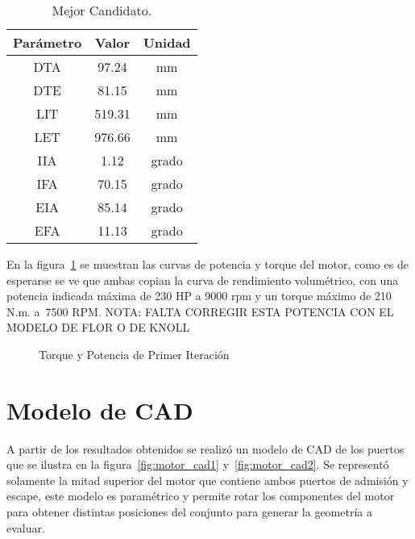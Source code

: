 \begin{table}
  \centering
  \begin{tabular}{ccc} \toprule
    Parámetro & Valor & Unidad \\ \midrule
    DTA & 97.24 & mm\\
    DTE & 81.15 & mm\\
    LIT & 519.31 & mm\\
    LET & 976.66 & mm\\
    IIA & 1.12 & grado\\
    IFA & 70.15 & grado\\
    EIA & 85.14 & grado\\
    EFA & 11.13 & grado\\ \bottomrule
  \end{tabular}
  \caption{Mejor Candidato.}\label{tab:resultado_primer_it}
\end{table}

En la figura~\ref{fig:PoTi_primer_op} se muestran las curvas de potencia y
torque del motor, como es de esperarse se ve que ambas copian la curva de
rendimiento volumétrico, con una potencia indicada máxima de 230 HP a 9000 rpm y
un torque máximo de 210 N.m. a\ 7500 RPM.
NOTA: FALTA CORREGIR ESTA POTENCIA CON EL MODELO DE FLOR O DE KNOLL

\begin{figure}
  \begin{center}
  \end{center}
  \caption{Torque y Potencia de Primer Iteración} \label{fig:PoTi_primer_op}
\end{figure}


\section{Modelo de CAD}
%
A partir de los resultados obtenidos se realizó un modelo de CAD de los puertos
que se ilustra en la figura~\ref{fig:motor_cad1} y~\ref{fig:motor_cad2}.
%
Se representó solamente la mitad superior del motor que contiene ambos puertos
de admisión y escape, este modelo es paramétrico y permite rotar los componentes
del motor para obtener distintas posiciones del conjunto para generar la
geometría a evaluar.

